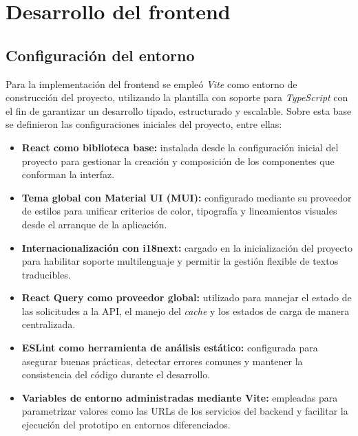 \section{Desarrollo del frontend}

\subsection{Configuración del entorno}

Para la implementación del frontend se empleó \textit{Vite} como entorno de construcción del proyecto, utilizando la plantilla con soporte para \textit{TypeScript} con el fin de garantizar un desarrollo tipado, estructurado y escalable. Sobre esta base se definieron las configuraciones iniciales del proyecto, entre ellas:

\begin{itemize}
    \item \textbf{React como biblioteca base:} instalada desde la configuración inicial del proyecto para gestionar la creación y composición de los componentes que conforman la interfaz.

    \item \textbf{Tema global con Material UI (MUI):} configurado mediante su proveedor de estilos para unificar criterios de color, tipografía y lineamientos visuales desde el arranque de la aplicación.

    \item \textbf{Internacionalización con i18next:} cargado en la inicialización del proyecto para habilitar soporte multilenguaje y permitir la gestión flexible de textos traducibles.

    \item \textbf{React Query como proveedor global:} utilizado para manejar el estado de las solicitudes a la API, el manejo del \textit{cache} y los estados de carga de manera centralizada.

    \item \textbf{ESLint como herramienta de análisis estático:} configurada para asegurar buenas prácticas, detectar errores comunes y mantener la consistencia del código durante el desarrollo.

    \item \textbf{Variables de entorno administradas mediante Vite:} empleadas para parametrizar valores como las URLs de los servicios del backend y facilitar la ejecución del prototipo en entornos diferenciados.
\end{itemize}

